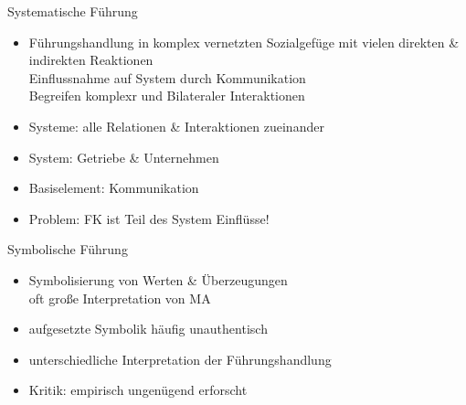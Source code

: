 \documentclass{cheatsheet}
\begin{document}
    \begin{sectionbox}{Systematische Führung}
        \begin{itemize}
            \item Führungshandlung in komplex vernetzten Sozialgefüge mit vielen direkten \& indirekten Reaktionen\\
            \ra Einflussnahme auf System durch Kommunikation\\
            \ra Begreifen komplexr und Bilateraler Interaktionen
            \item Systeme: alle Relationen \& Interaktionen zueinander
            \item System: Getriebe \& Unternehmen
            \item Basiselement: Kommunikation
            \item Problem: FK ist Teil des System \rightleftharpoons Einflüsse!
        \end{itemize}
    \end{sectionbox}
        \begin{sectionbox}{Symbolische Führung}
        \begin{itemize}
            \item Symbolisierung von Werten \& Überzeugungen\\
            \ra oft große Interpretation von MA
            \item aufgesetzte Symbolik häufig unauthentisch
            \item unterschiedliche Interpretation der Führungshandlung
            \item Kritik: empirisch ungenügend erforscht
        \end{itemize}
    \end{sectionbox}
\end{document}
